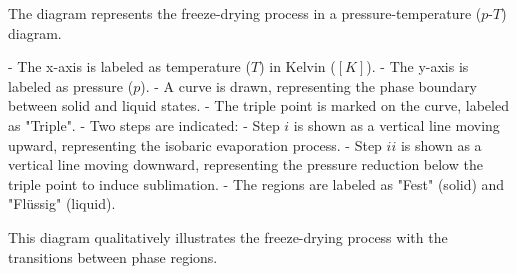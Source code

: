 The diagram represents the freeze-drying process in a pressure-temperature (\(p\)-\(T\)) diagram.  

- The x-axis is labeled as temperature (\(T\)) in Kelvin (\([K]\)).  
- The y-axis is labeled as pressure (\(p\)).  
- A curve is drawn, representing the phase boundary between solid and liquid states.  
- The triple point is marked on the curve, labeled as "Triple".  
- Two steps are indicated:  
  - Step \(i\) is shown as a vertical line moving upward, representing the isobaric evaporation process.  
  - Step \(ii\) is shown as a vertical line moving downward, representing the pressure reduction below the triple point to induce sublimation.  
- The regions are labeled as "Fest" (solid) and "Flüssig" (liquid).  

This diagram qualitatively illustrates the freeze-drying process with the transitions between phase regions.
